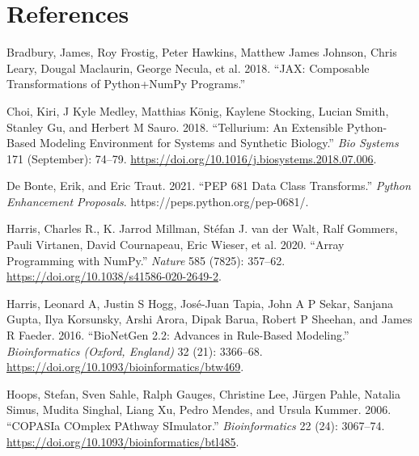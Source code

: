 \documentclass[
  letterpaper,
  DIV=11,
  numbers=noendperiod]{scrartcl}
\newlength{\cslhangindent}
\newlength{\cslentryspacingunit} %
\newenvironment{CSLReferences}[2] %
 {%
  \setlength{\parindent}{0pt}
  \ifodd #1
  \let\oldpar\par
  \def\par{\hangindent=\cslhangindent\oldpar}
  \fi
  \setlength{\parskip}{#2\cslentryspacingunit}
 }%
 {}
\begin{document}
\hypertarget{references}{%
\section{References}\label{references}}

\hypertarget{refs}{}
\begin{CSLReferences}{1}{0}
\leavevmode{}%
Bradbury, James, Roy Frostig, Peter Hawkins, Matthew James Johnson,
Chris Leary, Dougal Maclaurin, George Necula, et al. 2018. {``{JAX}:
Composable Transformations of {Python}+{NumPy} Programs.''}

\leavevmode{}%
Choi, Kiri, J Kyle Medley, Matthias König, Kaylene Stocking, Lucian
Smith, Stanley Gu, and Herbert M Sauro. 2018. {``Tellurium: {An}
Extensible Python-Based Modeling Environment for Systems and Synthetic
Biology.''} \emph{Bio Systems} 171 (September): 74--79.
\url{https://doi.org/10.1016/j.biosystems.2018.07.006}.

\leavevmode{}%
De Bonte, Erik, and Eric Traut. 2021. {``{PEP} 681 {\textendash} {Data
Class Transforms}.''} \emph{Python Enhancement Proposals}.
https://peps.python.org/pep-0681/.

\leavevmode{}%
Harris, Charles R., K. Jarrod Millman, Stéfan J. van der Walt, Ralf
Gommers, Pauli Virtanen, David Cournapeau, Eric Wieser, et al. 2020.
{``Array Programming with {NumPy}.''} \emph{Nature} 585 (7825): 357--62.
\url{https://doi.org/10.1038/s41586-020-2649-2}.

\leavevmode{}%
Harris, Leonard A, Justin S Hogg, José-Juan Tapia, John A P Sekar,
Sanjana Gupta, Ilya Korsunsky, Arshi Arora, Dipak Barua, Robert P
Sheehan, and James R Faeder. 2016. {``{BioNetGen} 2.2: Advances in
Rule-Based Modeling.''} \emph{Bioinformatics (Oxford, England)} 32 (21):
3366--68. \url{https://doi.org/10.1093/bioinformatics/btw469}.

\leavevmode{}%
Hoops, Stefan, Sven Sahle, Ralph Gauges, Christine Lee, Jürgen Pahle,
Natalia Simus, Mudita Singhal, Liang Xu, Pedro Mendes, and Ursula
Kummer. 2006. {``{COPASI}{\textemdash}a {COmplex PAthway SImulator}.''}
\emph{Bioinformatics} 22 (24): 3067--74.
\url{https://doi.org/10.1093/bioinformatics/btl485}.


\end{CSLReferences}
\end{document}
